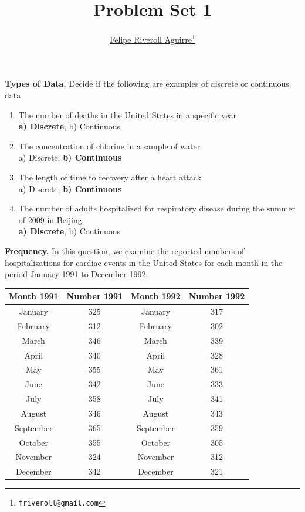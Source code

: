 \documentclass{article}
\begin{document}


\title{Problem Set 1}
\author{\href{http://feliperiveroll.name}{Felipe Riveroll Aguirre}\footnote{\texttt{friveroll@gmail.com}}} 
\maketitle

\textbf{Types of Data.} Decide if the following are examples of discrete or continuous data

\begin{enumerate}
  \item The number of deaths in the United States in a specific year\\
\textbf{a) Discrete}, b) Continuous\\ 
  \item The concentration of chlorine in a sample of water\\
a) Discrete, \textbf{b) Continuous}\\ 
  \item The length of time to recovery after a heart attack\\
a) Discrete, \textbf{b) Continuous}\\ 
  \item The number of adults hospitalized for respiratory disease during the summer of 2009 in Beijing\\
\textbf{a) Discrete}, b) Continuous \\
\end{enumerate}

\pagebreak

\textbf{Frequency.} In this question, we examine the reported numbers of hospitalizations for cardiac events in the United States for each month in the period January 1991 to December 1992.

\begin{table}[ht]
\begin{center}
\begin{tabular}{cccc}
  \hline
Month 1991 & Number 1991 & Month 1992 & Number 1992 \\ 
  \hline
January & 325 & January & 317 \\ 
February & 312 & February & 302 \\ 
March & 346 & March & 339 \\ 
April & 340 & April & 328 \\ 
May & 355 &   May & 361 \\ 
June & 342 &   June & 333 \\ 
July & 358 &   July & 341 \\ 
August & 346 &   August & 343 \\ 
September & 365 &   September & 359 \\ 
October & 355 &  October & 305 \\ 
November & 324 &  November & 312 \\ 
December & 342 &  December & 321 \\ 
   \hline
\end{tabular}
\end{center}
\end{table}
\end{document}
